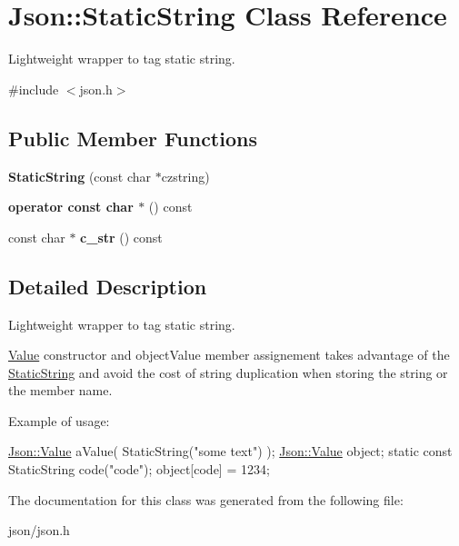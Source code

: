\hypertarget{classJson_1_1StaticString}{}\section{Json\+:\+:Static\+String Class Reference}
\label{classJson_1_1StaticString}


Lightweight wrapper to tag static string.  




{\ttfamily \#include $<$json.\+h$>$}

\subsection*{Public Member Functions}
\begin{DoxyCompactItemize}
\item 
\mbox{\label{classJson_1_1StaticString_afb6baf1ec078ce76f0b0f9b39d19437f}} 
{\bfseries Static\+String} (const char $\ast$czstring)
\item 
\mbox{\label{classJson_1_1StaticString_a256a6cc0c630aef670848a0f11707b62}} 
{\bfseries operator const char $\ast$} () const
\item 
\mbox{\label{classJson_1_1StaticString_ad6be703d432d108623bb0aa06b0b90ca}} 
const char $\ast$ {\bfseries c\+\_\+str} () const
\end{DoxyCompactItemize}


\subsection{Detailed Description}
Lightweight wrapper to tag static string. 

\hyperlink{classJson_1_1Value}{Value} constructor and object\+Value member assignement takes advantage of the \hyperlink{classJson_1_1StaticString}{Static\+String} and avoid the cost of string duplication when storing the string or the member name.

Example of usage\+: 
\begin{DoxyCode}
\hyperlink{classJson_1_1Value}{Json::Value} aValue( StaticString(\textcolor{stringliteral}{"some text"}) );
\hyperlink{classJson_1_1Value}{Json::Value} object;
\textcolor{keyword}{static} \textcolor{keyword}{const} StaticString code(\textcolor{stringliteral}{"code"});
\textcolor{keywordtype}{object}[code] = 1234;
\end{DoxyCode}
 

The documentation for this class was generated from the following file\+:\begin{DoxyCompactItemize}
\item 
json/json.\+h\end{DoxyCompactItemize}
